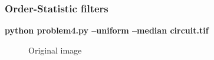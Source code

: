 \pagebreak
\subsubsection{Order-Statistic filters}

\begin{minipage}{\textwidth}
\textbf{python problem4.py --uniform --median circuit.tif} \\
\end{minipage}

\begin{figure}[!htb]\centering
    \begin{minipage}{0.45\textwidth}
        \caption{\small{Original image}}
    \end{minipage}
    \begin{minipage}{0.45\textwidth}

\end{minipage}
\end{figure}

